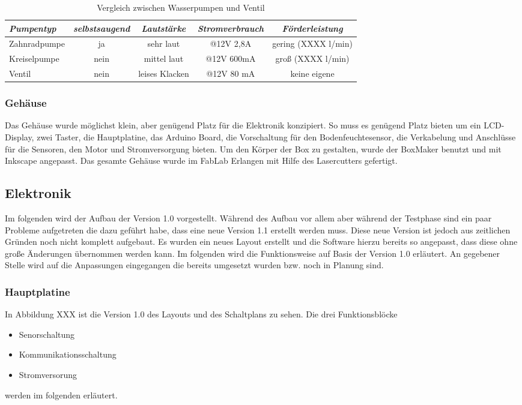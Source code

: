 \documentclass[]{IEEEtran}
\begin{document}
	\begin{table*}[!h]
	

	\begin{tabular}{|lcccc|}
	\hline
	\textit{Pumpentyp} & \textit{selbstsaugend} & \textit{Lautstärke} & \textit{Stromverbrauch} & \textit{Förderleistung} \\ \hline
	Zahnradpumpe & ja & sehr laut & @12V 2,8A & gering (XXXX l/min)\\
	Kreiselpumpe & nein & mittel laut & @12V 600mA & groß (XXXX l/min)\\
	Ventil & nein & leises Klacken & @12V 80 mA & keine eigene \\
	\hline
	\end{tabular}
	\caption{Vergleich zwischen Wasserpumpen und Ventil}
	\label{Vergleich zwischen Wasserpumpen und Ventil}
	
	\end{table*}	%
	
	\subsubsection{Gehäuse}
	Das Gehäuse wurde möglichst klein, aber genügend Platz für die Elektronik konzipiert.
	So muss es genügend Platz bieten um ein LCD-Display, zwei Taster, die Hauptplatine, das Arduino Board,  die Vorschaltung für den Bodenfeuchtesensor, die Verkabelung und Anschlüsse für die Sensoren, den Motor und Stromversorgung  bieten.
	Um den Körper der Box zu gestalten, wurde der BoxMaker benutzt und mit Inkscape angepasst. 
	Das gesamte Gehäuse wurde im FabLab Erlangen mit Hilfe des Lasercutters gefertigt.
	
	\subsection{Elektronik}
	Im folgenden wird der Aufbau der Version 1.0 vorgestellt. Während des Aufbau vor allem aber während der Testphase sind ein paar Probleme aufgetreten die dazu geführt habe, dass eine neue Version 1.1 erstellt werden muss. Diese neue Version ist jedoch aus zeitlichen Gründen noch nicht komplett aufgebaut. Es wurden ein neues Layout erstellt und die Software hierzu bereits so angepasst, dass diese ohne große Änderungen übernommen werden kann. Im folgenden wird die Funktionsweise auf Basis der Version 1.0 erläutert. An gegebener Stelle wird auf die  Anpassungen eingegangen die bereits umgesetzt wurden bzw. noch in Planung sind. 

	\subsubsection{Hauptplatine}
	In Abbildung XXX ist die Version 1.0 des Layouts und des Schaltplans zu sehen. Die drei Funktionsblöcke
		\begin{itemize}
			\item Senorschaltung
			\item Kommunikationsschaltung
			\item Stromversorung
		\end{itemize}
	werden im folgenden erläutert. 
		
\end{document}

